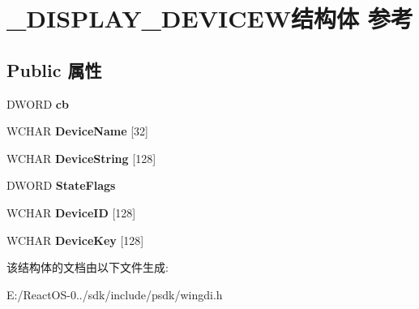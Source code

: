 \hypertarget{struct___d_i_s_p_l_a_y___d_e_v_i_c_e_w}{}\section{\+\_\+\+D\+I\+S\+P\+L\+A\+Y\+\_\+\+D\+E\+V\+I\+C\+E\+W结构体 参考}
\label{struct___d_i_s_p_l_a_y___d_e_v_i_c_e_w}
\subsection*{Public 属性}
\begin{DoxyCompactItemize}
\item 
\mbox{\label{struct___d_i_s_p_l_a_y___d_e_v_i_c_e_w_a09df10cd0092f28951226066073a5ab0}} 
D\+W\+O\+RD {\bfseries cb}
\item 
\mbox{\label{struct___d_i_s_p_l_a_y___d_e_v_i_c_e_w_a161b869a6265f2bcb2d01c4270074793}} 
W\+C\+H\+AR {\bfseries Device\+Name} \mbox{[}32\mbox{]}
\item 
\mbox{\label{struct___d_i_s_p_l_a_y___d_e_v_i_c_e_w_a381d24650837c8dfd0432975ce0802f9}} 
W\+C\+H\+AR {\bfseries Device\+String} \mbox{[}128\mbox{]}
\item 
\mbox{\label{struct___d_i_s_p_l_a_y___d_e_v_i_c_e_w_a2b99c92ddc13175e65ec22a4835cc3d7}} 
D\+W\+O\+RD {\bfseries State\+Flags}
\item 
\mbox{\label{struct___d_i_s_p_l_a_y___d_e_v_i_c_e_w_ac31f561ead9ec41746248e0ef55dde5f}} 
W\+C\+H\+AR {\bfseries Device\+ID} \mbox{[}128\mbox{]}
\item 
\mbox{\label{struct___d_i_s_p_l_a_y___d_e_v_i_c_e_w_a659b6528d30127e93c4be9db0d8bbc3f}} 
W\+C\+H\+AR {\bfseries Device\+Key} \mbox{[}128\mbox{]}
\end{DoxyCompactItemize}


该结构体的文档由以下文件生成\+:\begin{DoxyCompactItemize}
\item 
E\+:/\+React\+O\+S-\/0../sdk/include/psdk/wingdi.\+h\end{DoxyCompactItemize}
